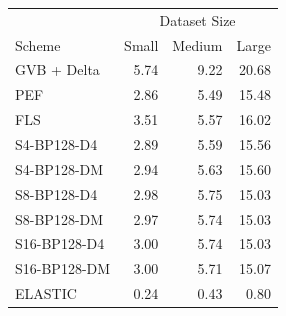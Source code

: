 \begin{tabular}{lrrr}
\toprule
 & \multicolumn{3}{c}{Dataset Size} \\
Scheme & Small & Medium & Large \\
\midrule
GVB + Delta & 5.74 & 9.22 & 20.68 \\
PEF & 2.86 & 5.49 & 15.48 \\
FLS & 3.51 & 5.57 & 16.02 \\
S4-BP128-D4 & 2.89 & 5.59 & 15.56 \\
S4-BP128-DM & 2.94 & 5.63 & 15.60 \\
S8-BP128-D4 & 2.98 & 5.75 & 15.03 \\
S8-BP128-DM & 2.97 & 5.74 & 15.03 \\
S16-BP128-D4 & 3.00 & 5.74 & 15.03 \\
S16-BP128-DM & 3.00 & 5.71 & 15.07 \\
ELASTIC & 0.24 & 0.43 & 0.80 \\
\bottomrule
\end{tabular}
